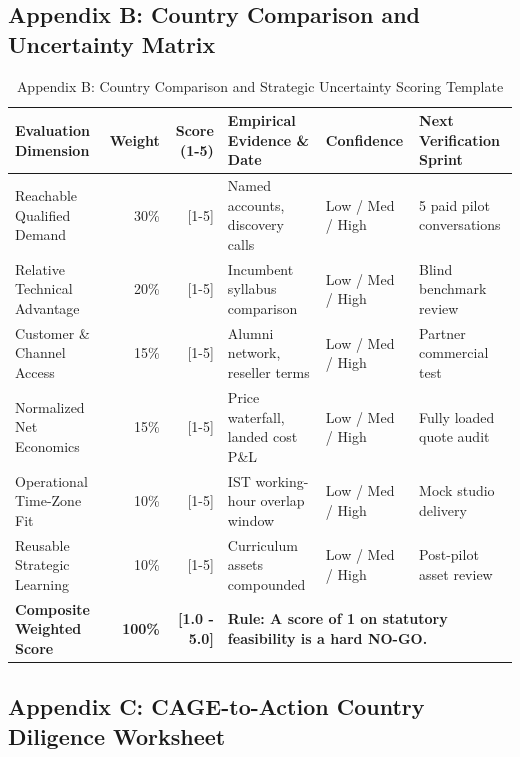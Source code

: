 \subsection{Appendix B: Country Comparison and Uncertainty Matrix}

\begin{table}[t]
\centering
\small
\caption{Appendix B: Country Comparison and Strategic Uncertainty Scoring Template}
\label{tab:app_country_comparison}
\begin{tabularx}{\textwidth}{p{4.2cm} r r p{3.6cm} p{2.2cm} X}
\toprule
\textbf{Evaluation Dimension} & \textbf{Weight} & \textbf{Score (1-5)} & \textbf{Empirical Evidence \& Date} & \textbf{Confidence} & \textbf{Next Verification Sprint} \\
\midrule
Reachable Qualified Demand & 30\% & [1-5] & Named accounts, discovery calls & Low / Med / High & 5 paid pilot conversations \\
Relative Technical Advantage & 20\% & [1-5] & Incumbent syllabus comparison & Low / Med / High & Blind benchmark review \\
Customer \& Channel Access & 15\% & [1-5] & Alumni network, reseller terms & Low / Med / High & Partner commercial test \\
Normalized Net Economics & 15\% & [1-5] & Price waterfall, landed cost P\&L & Low / Med / High & Fully loaded quote audit \\
Operational Time-Zone Fit & 10\% & [1-5] & IST working-hour overlap window & Low / Med / High & Mock studio delivery \\
Reusable Strategic Learning & 10\% & [1-5] & Curriculum assets compounded & Low / Med / High & Post-pilot asset review \\
\midrule
\textbf{Composite Weighted Score} & \textbf{100\%} & \textbf{[1.0 - 5.0]} & \multicolumn{3}{l}{\textbf{Rule: A score of 1 on statutory feasibility is a hard NO-GO.}} \\
\bottomrule
\end{tabularx}
\end{table}

\subsection{Appendix C: CAGE-to-Action Country Diligence Worksheet}

